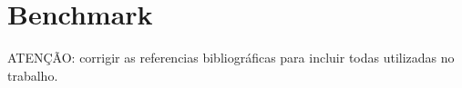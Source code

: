 \section{Benchmark}

ATENÇÃO: corrigir as referencias bibliográficas para incluir todas utilizadas no trabalho.
